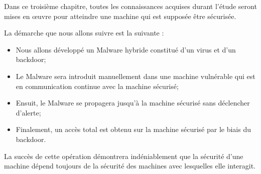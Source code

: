 


Dans ce troisième chapitre, toutes les connaissances acquises durant l'étude seront mises en œuvre pour atteindre
une machine qui est supposée être sécurisée. %

La démarche que nous allons suivre est la suivante : 
\begin{itemize}
    \item Nous allons développé un Malware hybride constitué d'un virus et d'un backdoor;
    \item Le Malware sera introduit manuellement dans une machine vulnérable qui est en communication continue
        avec la machine sécurisé;
    \item Ensuit, le Malware se propagera jusqu'à la machine sécurisé sans déclencher d'alerte;
    \item Finalement, un accès total est obtenu sur la machine sécurisé par le biais du backdoor.
\end{itemize}

La succès de cette opération démontrera indéniablement que la sécurité d'une machine dépend toujours
de la sécurité des machines avec lesquelles elle interagit.



